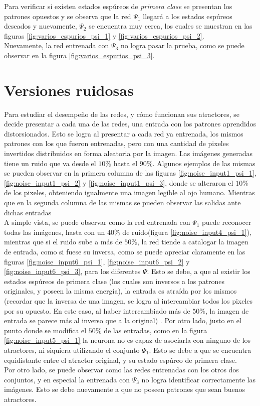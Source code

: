 \documentclass{sig-alternate}
\begin{document}
Para verificar si existen estados espúreos de \textit{primera clase} se presentan los patrones opuestos y se observa que la red  $\Psi_1$ llegará a los estados espúreos deseados y nuevamente, $\Psi_2$ se encuentra muy cerca, los cuales se muestran en las figuras \ref{fig:varios_espurios_psi_1} y \ref{fig:varios_espurios_psi_2}.\\

Nuevamente, la red entrenada con $\Psi_3$ no logra pasar la prueba, como se puede observar en la figura \ref{fig:varios_espurios_psi_3}. \\

\section*{Versiones ruidosas}

Para estudiar el desempeño de las redes, y cómo funcionan sus atractores, se decide presentar a cada una de las redes, una entrada con los patrones aprendidos distorsionados. Esto se logra al presentar a cada red ya entrenada, los mismos patrones con los que fueron entrenadas, pero con una cantidad de pixeles invertidos distribuidos en forma aleatoria por la imagen. Las imágenes generadas tiene un ruido que va desde el $10\%$ hasta el $90\%$. Algunos ejemplos de las mismas se pueden observar en la primera columna de las figuras  \ref{fig:noise_input1_psi_1}, \ref{fig:noise_input1_psi_2} y \ref{fig:noise_input1_psi_3}, donde se alteraron el $10\%$ de los pixeles, obteniendo igualmente una imagen legible al ojo humano.  Mientras que en la segunda columna de las mismas se pueden observar las salidas ante dichas entradas\\
A simple vista, se puede observar como la red entrenada con $\Psi_1$ puede reconocer todas las imágenes, hasta con un $40\%$ de ruido(figura \ref{fig:noise_input4_psi_1}), mientras que si el ruido sube a más de  $50\%$, la red tiende a catalogar la imagen de entrada, como si fuese su inversa, como se puede apreciar claramente en las figuras \ref{fig:noise_input6_psi_1}, \ref{fig:noise_input6_psi_2} y \ref{fig:noise_input6_psi_3}, para los diferentes $\Psi$. Esto se debe, a que al existir los estados espúreos de primera clase (los cuales son inversos a los patrones originales, y poseen la misma energía), la entrada es atraída por los mismos (recordar que la inversa de una imagen, se logra al intercambiar todos los pixeles por su opuesto. En este caso, al haber intercambiado más de $50\%$, la imagen de entrada se parece más al inverso que a la original) . Por otro lado, justo en el punto donde se modifica el $50\%$ de las entradas, como en la figura \ref{fig:noise_input5_psi_1} la neurona no es capaz de asociarla con ninguno de los atractores, ni siquiera utilizando el conjunto $\Psi_1$. Esto se debe a que se encuentra equidistante entre el atractor original, y su estado espúreo de primera clase.\\
Por otro lado, se puede observar como las redes entrenadas con los otros dos conjuntos, y en especial la entrenada con $\Psi_3$ no logra identificar correctamente las imágenes. Esto se debe nuevamente a que no poseen patrones que sean buenos atractores.\\
\end{document}
